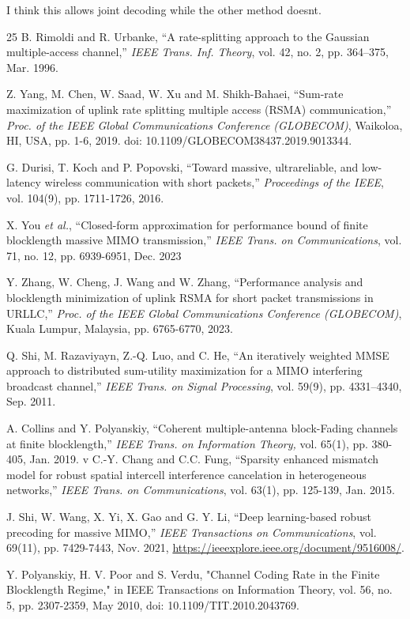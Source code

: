 \documentclass[a4paper, 12pt, onecolumn, journal, twoside, draftclsnofoot]{IEEEtran}
\begin{document}
I think this allows joint decoding while the other method doesnt.



\begin{thebibliography}{25} 
B. Rimoldi and R. Urbanke, ``A rate-splitting approach to the Gaussian multiple-access channel,'' \emph{IEEE Trans. Inf. Theory},  vol. 42, no. 2, pp. 364–375, Mar. 1996.

Z. Yang, M. Chen, W. Saad, W. Xu and M. Shikh-Bahaei, ``Sum-rate maximization of uplink rate splitting multiple access (RSMA) communication,'' \emph{Proc. of the IEEE Global Communications Conference (GLOBECOM)}, Waikoloa, HI, USA, pp. 1-6, 2019.  doi: 10.1109/GLOBECOM38437.2019.9013344.

G. Durisi, T. Koch and P. Popovski, ``Toward massive, ultrareliable, and low-latency wireless communication with short packets,'' \emph{Proceedings of the IEEE}, vol. 104(9), pp. 1711-1726, 2016.

X. You \emph{et al.}, ``Closed-form approximation for performance bound of finite blocklength massive MIMO transmission,'' \emph{IEEE Trans. on Communications}, vol. 71, no. 12, pp. 6939-6951, Dec. 2023

Y. Zhang, W. Cheng, J. Wang and W. Zhang, ``Performance analysis and blocklength minimization of uplink RSMA for short packet transmissions in URLLC,'' \emph{Proc. of the IEEE Global Communications Conference (GLOBECOM)}, Kuala Lumpur, Malaysia, pp. 6765-6770, 2023.

Q. Shi, M. Razaviyayn, Z.-Q. Luo, and C. He, ``An iteratively weighted MMSE approach to distributed sum-utility maximization for a MIMO interfering broadcast channel,'' \emph{IEEE Trans. on Signal Processing}, vol. 59(9), pp. 4331–4340, Sep. 2011.

A. Collins and Y. Polyanskiy, ``Coherent multiple-antenna block-Fading channels at finite blocklength,'' \emph{IEEE Trans. on Information Theory,} vol. 65(1), pp. 380-405, Jan. 2019.
v
C.-Y. Chang and C.C. Fung, ``Sparsity enhanced mismatch model for robust spatial intercell interference cancelation in heterogeneous networks,'' \emph{IEEE Trans. on Communications}, vol. 63(1), pp. 125-139, Jan. 2015.

J. Shi, W. Wang, X. Yi, X. Gao and G. Y. Li, ``Deep learning-based robust precoding for massive MIMO,'' \emph{IEEE Transactions on Communications}, vol. 69(11), pp. 7429-7443, Nov. 2021, \href{https://ieeexplore.ieee.org/document/9516008/}{https://ieeexplore.ieee.org/document/9516008/}.

Y. Polyanskiy, H. V. Poor and S. Verdu, "Channel Coding Rate in the Finite Blocklength Regime," in IEEE Transactions on Information Theory, vol. 56, no. 5, pp. 2307-2359, May 2010, doi: 10.1109/TIT.2010.2043769.



\end{thebibliography}
\end{document}
